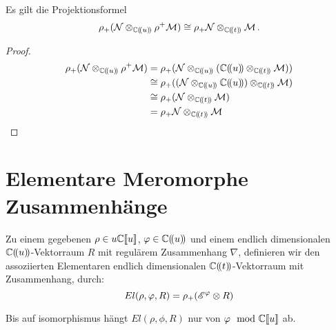 \begin{thm} \label{thm:Projektionsformel}
\cite[1.a]{sabbah_Fourier-local}
Es gilt die Projektionsformel
\begin{equation} \label{eq:Projektionsformel}
\rho_+(\mathcal{N}\otimes_{\mathbb{C}(\!(u)\!)}\rho^+\mathcal{M}) \cong
\rho_+\mathcal{N}\otimes_{\mathbb{C}(\!(t)\!)}\mathcal{M}\,.
\end{equation}
\end{thm}
\begin{proof}
\begin{align*}
\rho_+(\cN\otimes_{\C(\!(u)\!)}\rho^+\cM) &=
\rho_+(\cN\otimes_{\C(\!(u)\!)}(\C(\!(u)\!)\otimes_{\C(\!(t)\!)}\cM)) \\
&\cong \rho_+((\cN\otimes_{\C(\!(u)\!)}\C(\!(u)\!))
\otimes_{\C(\!(t)\!)}\cM) \\
&\cong \rho_+(\cN\otimes_{\C(\!(t)\!)}\cM) \\
&= \rho_+\cN\otimes_{\C(\!(t)\!)}\cM \\
\end{align*}
\end{proof}

\begin{comment}
Sei $\rho(u)=u^p=t$ und $\phi(t)$ gegeben.
\begin{align*}
\rho^+\sE^{\phi(t)}&=\sE^{\phi(\rho(u))}=\sE^{\phi(u^p)}\\
\rho^+\rho_+\sE^{\phi(u)}
&=\underset{\zeta\in\mu_p}{\bigoplus}\sE^{\phi(\zeta\cdot u)}\\
\end{align*}
\end{comment}

\section{Elementare Meromorphe Zusammenhänge}

\begin{defn}
\cite[Def 2.1]{sabbah_Fourier-local}
Zu einem gegebenen $\rho\in u\mathbb{C}\llbracket u\rrbracket$,
$\varphi\in\mathbb{C}(\!(u)\!)$ und einem endlich dimensionalen
$\mathbb{C}(\!(u)\!)$-Vektorraum $R$ mit regulärem Zusammenhang $\nabla$,
definieren wir den assoziierten Elementaren endlich dimensionalen
$\mathbb{C}(\!(t)\!)$-Vektorraum mit Zusammenhang, durch:
\[
El(\rho,\varphi,R)=\rho_+(\mathscr{E}^\varphi\otimes R)
\]
\end{defn}
\cite[nach Def 2.1]{sabbah_Fourier-local}
Bis auf isomorphismus hängt $El(\rho,\phi,R)$ nur von $\varphi\mod{{\mathbb C\llbracket u\rrbracket}}$ ab.
\begin{lem}
\cite[Lem 2.2]{sabbah_Fourier-local}
\end{lem}


